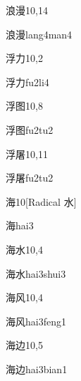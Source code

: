 \begin{entry}{浪漫}{10,14}
  \begin{phonetics}{浪漫}{lang4man4}
  \end{phonetics}
\end{entry}

\begin{entry}{浮力}{10,2}
  \begin{phonetics}{浮力}{fu2li4}
  \end{phonetics}
\end{entry}

\begin{entry}{浮图}{10,8}
  \begin{phonetics}{浮图}{fu2tu2}
  \end{phonetics}
\end{entry}

\begin{entry}{浮屠}{10,11}
  \begin{phonetics}{浮屠}{fu2tu2}
  \end{phonetics}
\end{entry}

\begin{entry}{海}{10}[Radical 水]
  \begin{phonetics}{海}{hai3}
  \end{phonetics}
\end{entry}

\begin{entry}{海水}{10,4}
  \begin{phonetics}{海水}{hai3shui3}
  \end{phonetics}
\end{entry}

\begin{entry}{海风}{10,4}
  \begin{phonetics}{海风}{hai3feng1}
  \end{phonetics}
\end{entry}

\begin{entry}{海边}{10,5}
  \begin{phonetics}{海边}{hai3bian1}
  \end{phonetics}
\end{entry}

